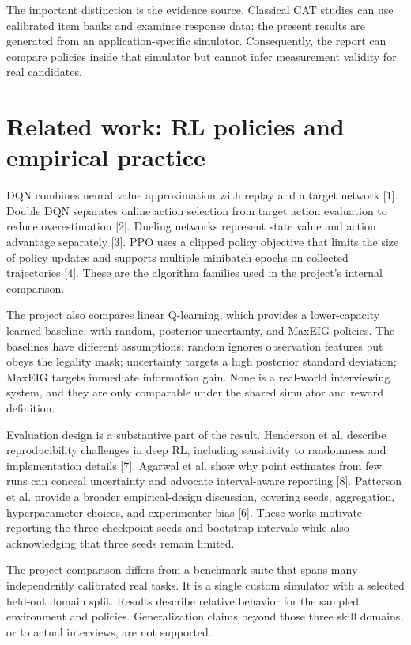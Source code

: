 \documentclass{ieeeaccess}
\begin{document}
The important distinction is the evidence source. Classical CAT studies can use calibrated item banks and examinee response data; the present results are generated from an application-specific simulator. Consequently, the report can compare policies inside that simulator but cannot infer measurement validity for real candidates.

\section{Related work: RL policies and empirical practice}

DQN combines neural value approximation with replay and a target network [1]. Double DQN separates online action selection from target action evaluation to reduce overestimation [2]. Dueling networks represent state value and action advantage separately [3]. PPO uses a clipped policy objective that limits the size of policy updates and supports multiple minibatch epochs on collected trajectories [4]. These are the algorithm families used in the project's internal comparison.

The project also compares linear Q-learning, which provides a lower-capacity learned baseline, with random, posterior-uncertainty, and MaxEIG policies. The baselines have different assumptions: random ignores observation features but obeys the legality mask; uncertainty targets a high posterior standard deviation; MaxEIG targets immediate information gain. None is a real-world interviewing system, and they are only comparable under the shared simulator and reward definition.

Evaluation design is a substantive part of the result. Henderson et al. describe reproducibility challenges in deep RL, including sensitivity to randomness and implementation details [7]. Agarwal et al. show why point estimates from few runs can conceal uncertainty and advocate interval-aware reporting [8]. Patterson et al. provide a broader empirical-design discussion, covering seeds, aggregation, hyperparameter choices, and experimenter bias [6]. These works motivate reporting the three checkpoint seeds and bootstrap intervals while also acknowledging that three seeds remain limited.

The project comparison differs from a benchmark suite that spans many independently calibrated real tasks. It is a single custom simulator with a selected held-out domain split. Results describe relative behavior for the sampled environment and policies. Generalization claims beyond those three skill domains, or to actual interviews, are not supported.
\end{document}

